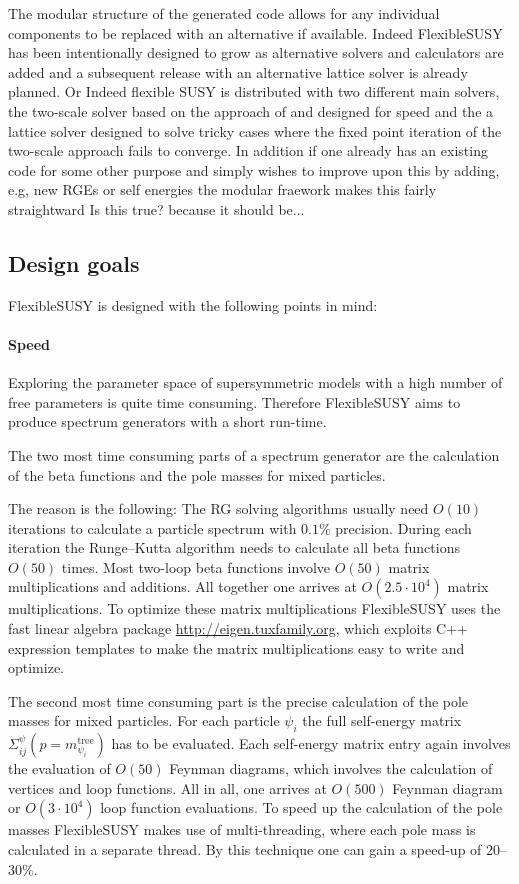 \documentclass[final,3p,times,pdflatex]{elsarticle}
\newcommand{\fs}{FlexibleSUSY\xspace}
\begin{document}
 The modular structure of the generated code allows for any individual
 components to be replaced with an alternative if available.  Indeed
 \fs has been intentionally designed to grow as alternative solvers
 and calculators are added and a subsequent release with an
 alternative lattice solver is already planned.{\color{red} Or Indeed
   flexible SUSY is distributed with two different main solvers, the
   two-scale solver based on the approach of \cite{} and designed for
   speed and the a lattice solver designed to solve tricky cases where
   the fixed point iteration of the two-scale approach fails to
   converge.}  In addition if one already has an existing code for
 some other purpose and simply wishes to improve upon this by adding,
 e.g, new RGEs or self energies the modular fraework makes this fairly
 straightward{\color{red} Is this true?  because it should be...}


\subsection{Design goals}

FlexibleSUSY is designed with the following points in mind:

\paragraph{Speed}
Exploring the parameter space of supersymmetric models with a high
number of free parameters is quite time consuming.  Therefore
FlexibleSUSY aims to produce spectrum generators with a short run-time.

The two most time consuming parts of a spectrum generator are the
calculation of the beta functions and the pole masses for mixed
particles.

The reason is the following: The RG solving algorithms usually need
$O(10)$ iterations to calculate a particle spectrum with $0.1\%$
precision.  During each iteration the Runge--Kutta algorithm needs to
calculate all beta functions $O(50)$ times.  Most two-loop beta
functions involve $O(50)$ matrix multiplications and additions.  All
together one arrives at $O(2.5\cdot 10^4)$ matrix multiplications.  To
optimize these matrix multiplications FlexibleSUSY uses the fast
linear algebra package \href{Eigen}{http://eigen.tuxfamily.org}, which
exploits C++ expression templates to make the matrix multiplications
easy to write and optimize.

The second most time consuming part is the precise calculation of the
pole masses for mixed particles.  For each particle $\psi_i$ the full
self-energy matrix $\Sigma^\psi_{ij}(p=m^\text{tree}_{\psi_i})$ has to
be evaluated.  Each self-energy matrix entry again involves the
evaluation of $O(50)$ Feynman diagrams, which involves the calculation
of vertices and loop functions.  All in all, one arrives at $O(500)$
Feynman diagram or $O(3\cdot 10^4)$ loop function evaluations.  To
speed up the calculation of the pole masses FlexibleSUSY makes use of
multi-threading, where each pole mass is calculated in a separate
thread.  By this technique one can gain a speed-up of $20$--$30\%$.
\end{document}
